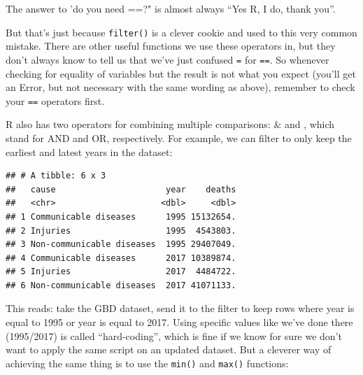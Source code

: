 \documentclass[12pt,]{krantz}
\makeatletter
\newenvironment{Shaded}{\begin{snugshade}}{\end{snugshade}}
\newcommand{\DecValTok}[1]{\textcolor[rgb]{0.00,0.00,0.81}{#1}}
\newcommand{\KeywordTok}[1]{\textcolor[rgb]{0.13,0.29,0.53}{\textbf{#1}}}
\newcommand{\NormalTok}[1]{#1}
\newcommand{\OperatorTok}[1]{\textcolor[rgb]{0.81,0.36,0.00}{\textbf{#1}}}
\newcommand{\StringTok}[1]{\textcolor[rgb]{0.31,0.60,0.02}{#1}}
\renewenvironment{quote}{\begin{VF}}{\end{VF}}
\newenvironment{kframe}{%
\medskip{}
\setlength{\fboxsep}{.8em}
 \def\at@end@of@kframe{}%
 \ifinner\ifhmode%
  \def\at@end@of@kframe{\end{minipage}}%
  \begin{minipage}{\columnwidth}%
 \fi\fi%
 \def\FrameCommand##1{\hskip\@totalleftmargin \hskip-\fboxsep
 \colorbox{shadecolor}{##1}\hskip-\fboxsep
     \hskip-\linewidth \hskip-\@totalleftmargin \hskip\columnwidth}%
 \MakeFramed {\advance\hsize-\width
   \@totalleftmargin\z@ \linewidth\hsize
   \@setminipage}}%
 {\par\unskip\endMakeFramed%
 \at@end@of@kframe}
\renewenvironment{Shaded}{\begin{kframe}}{\end{kframe}}
\theoremstyle{definition}
\theoremstyle{definition}
\theoremstyle{definition}
\theoremstyle{remark}
\makeatother
\begin{document}
\begin{quote}
The answer to 'do you need ==?" is almost always ``Yes R, I do, thank
you''.
\end{quote}

But that's just because \texttt{filter()} is a clever cookie and used to
this very common mistake. There are other useful functions we use these
operators in, but they don't always know to tell us that we've just
confused \texttt{=} for \texttt{==}. So whenever checking for equality
of variables but the result is not what you expect (you'll get an Error,
but not necessary with the same wording as above), remember to check
your \texttt{==} operators first.

R also has two operators for combining multiple comparisons: \& and
\textbar{}, which stand for AND and OR, respectively. For example, we
can filter to only keep the earliest and latest years in the dataset:

\begin{Shaded}
\end{Shaded}

\begin{verbatim}
## # A tibble: 6 x 3
##   cause                      year    deaths
##   <chr>                     <dbl>     <dbl>
## 1 Communicable diseases      1995 15132654.
## 2 Injuries                   1995  4543803.
## 3 Non-communicable diseases  1995 29407049.
## 4 Communicable diseases      2017 10389874.
## 5 Injuries                   2017  4484722.
## 6 Non-communicable diseases  2017 41071133.
\end{verbatim}

This reads: take the GBD dataset, send it to the filter to keep rows
where year is equal to 1995 or year is equal to 2017. Using specific
values like we've done there (1995/2017) is called ``hard-coding'',
which is fine if we know for sure we don't want to apply the same script
on an updated dataset. But a cleverer way of achieving the same thing is
to use the \texttt{min()} and \texttt{max()} functions:

\begin{Shaded}
\end{Shaded}
\end{document}
